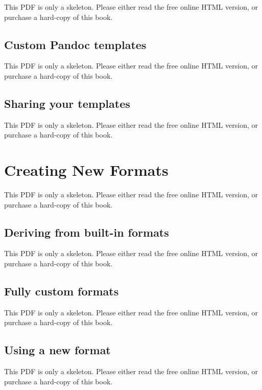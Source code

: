 \documentclass[
  11pt,
]{krantz}
\theoremstyle{definition}
\theoremstyle{definition}
\theoremstyle{definition}
\theoremstyle{definition}
\theoremstyle{remark}
\begin{document}
This PDF is only a skeleton. Please either read the free online HTML version, or purchase a hard-copy of this book.

\section{Custom Pandoc templates}\label{template-pandoc}

This PDF is only a skeleton. Please either read the free online HTML version, or purchase a hard-copy of this book.

\section{Sharing your templates}\label{template-share}

This PDF is only a skeleton. Please either read the free online HTML version, or purchase a hard-copy of this book.

\chapter{Creating New Formats}\label{new-formats}

This PDF is only a skeleton. Please either read the free online HTML version, or purchase a hard-copy of this book.

\section{Deriving from built-in formats}\label{format-derive}

This PDF is only a skeleton. Please either read the free online HTML version, or purchase a hard-copy of this book.

\section{Fully custom formats}\label{format-custom}

This PDF is only a skeleton. Please either read the free online HTML version, or purchase a hard-copy of this book.

\section{Using a new format}\label{format-use}

This PDF is only a skeleton. Please either read the free online HTML version, or purchase a hard-copy of this book.
\end{document}

